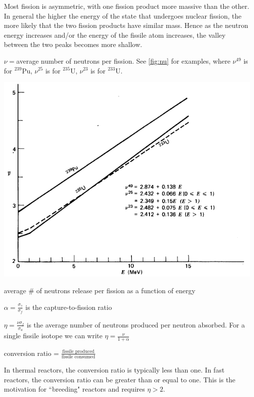 \documentclass[12pt]{article}
\begin{document}
Most fission is asymmetric, with one fission product more massive than the other. In general the higher the energy of the state that undergoes nuclear fission, the more likely that the two fission products have similar mass. Hence as the neutron energy increases and/or the energy of the fissile atom increases, the valley between the two peaks becomes more shallow.

$\nu=$average number of neutrons per fission. See \autoref{fig:nu} for examples, where $\nu^{49}$ is for $^{239}$Pu, $\nu^{25}$ is for $^{235}$U, $\nu^{23}$ is for $^{233}$U.
\begin{center}
\includegraphics[scale=0.6]{../figs/nu}
\caption{average \# of neutrons release per fission as a function of energy}
\label{fig:nu}
\end{center}

$\alpha = \frac{\sigma_\gamma}{\sigma_f}$ is the capture-to-fission ratio

$\eta = \frac{\nu \sigma_f}{\sigma_a}$ is the average number of neutrons produced per neutron absorbed. For a single fissile isotope we can write $\eta = \frac{\nu}{1+\alpha}$

conversion ratio = $\frac{\text{fissile produced}}{\text{fissile consumed}}$

In thermal reactors, the conversion ratio is typically less than one. In fast reactors, the conversion ratio can be greater than or equal to one. This is the motivation for ``breeding" reactors and requires $\eta >2$.
\end{document}
